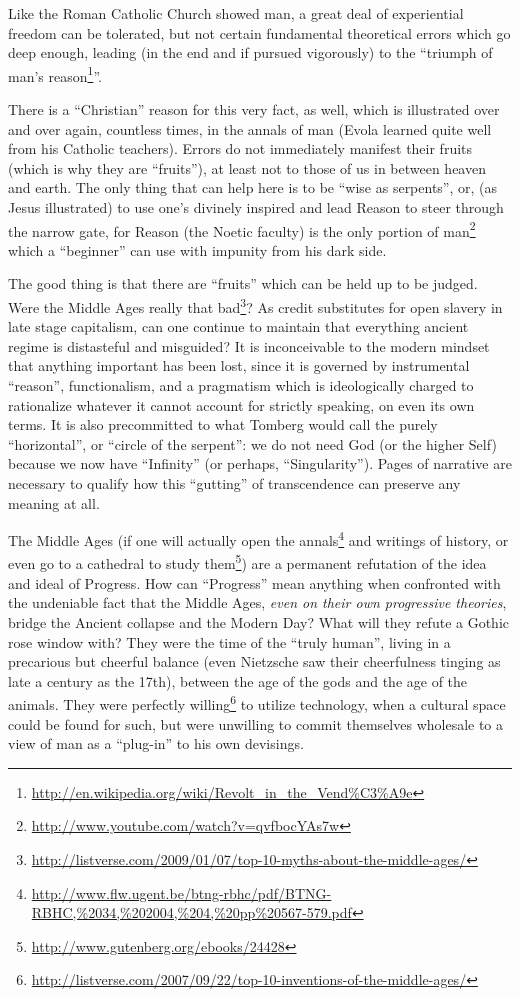 Like the Roman Catholic Church showed man, a great deal of experiential freedom can be tolerated, but not certain fundamental theoretical errors which go deep enough, leading (in the end and if pursued vigorously) to the ``triumph of man's reason\footnote{\url{http://en.wikipedia.org/wiki/Revolt_in_the_Vend\%C3\%A9e}}''.

There is a ``Christian'' reason for this very fact, as well, which is illustrated over and over again, countless times, in the annals of man (Evola learned quite well from his Catholic teachers). Errors do not immediately manifest their fruits (which is why they are ``fruits''), at least not to those of us in between heaven and earth. The only thing that can help here is to be ``wise as serpents'', or, (as Jesus illustrated) to use one's divinely inspired and lead Reason to steer through the narrow gate, for Reason (the Noetic faculty) is the only portion of man\footnote{\url{http://www.youtube.com/watch?v=qvfbocYAs7w}} which a ``beginner'' can use with impunity from his dark side.

The good thing is that there are ``fruits'' which can be held up to be judged. Were the Middle Ages really that bad\footnote{\url{http://listverse.com/2009/01/07/top-10-myths-about-the-middle-ages/}}? As credit substitutes for open slavery in late stage capitalism, can one continue to maintain that everything ancient regime is distasteful and misguided? It is inconceivable to the modern mindset that anything important has been lost, since it is governed by instrumental ``reason'', functionalism, and a pragmatism which is ideologically charged to rationalize whatever it cannot account for strictly speaking, on even its own terms. It is also precommitted to what Tomberg would call the purely ``horizontal'', or ``circle of the serpent'': we do not need God (or the higher Self) because we now have ``Infinity'' (or perhaps, ``Singularity''). Pages of narrative are necessary to qualify how this ``gutting'' of transcendence can preserve any meaning at all.

The Middle Ages (if one will actually open the annals\footnote{\url{http://www.flw.ugent.be/btng-rbhc/pdf/BTNG-RBHC,\%2034,\%202004,\%204,\%20pp\%20567-579.pdf}} and writings of history, or even go to a cathedral to study them\footnote{\url{http://www.gutenberg.org/ebooks/24428}}) are a permanent refutation of the idea and ideal of Progress. How can ``Progress'' mean anything when confronted with the undeniable fact that the Middle Ages, \emph{even on their own progressive theories}, bridge the Ancient collapse and the Modern Day? What will they refute a Gothic rose window with? They were the time of the ``truly human'', living in a precarious but cheerful balance (even Nietzsche saw their cheerfulness tinging as late a century as the 17th), between the age of the gods and the age of the animals. They were perfectly willing\footnote{\url{http://listverse.com/2007/09/22/top-10-inventions-of-the-middle-ages/}} to utilize technology, when a cultural space could be found for such, but were unwilling to commit themselves wholesale to a view of man as a ``plug-in'' to his own devisings.

